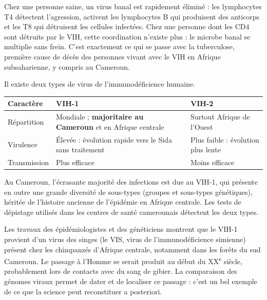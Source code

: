 \documentclass[11pt]{article}
\newcommand{\cle}[1]{{\popxbold\color{popdark}#1}}
\newcounter{popsec}
\newcounter{popsub}
\newcommand{\courssub}[1]{%
  \stepcounter{popsub}%
  \par\vspace{9pt}\noindent{\popxbold\fontsize{11.5}{13}\selectfont\color{popink}{\color{poporange}\thepopsec.\thepopsub}\hspace{6pt}#1}\par\nopagebreak\vspace{4pt}
}
\begin{document}
\begin{exemplebox}
Chez une personne saine, un virus banal est rapidement éliminé : les lymphocytes T4 détectent l'agression, activent les lymphocytes B qui produisent des anticorps et les T8 qui détruisent les cellules infectées. Chez une personne dont les CD4 sont détruits par le VIH, cette coordination n'existe plus : le microbe banal se multiplie sans frein. C'est exactement ce qui se passe avec la tuberculose, première cause de décès des personnes vivant avec le VIH en Afrique subsaharienne, y compris au Cameroun.
\end{exemplebox}

\courssub{Les types de VIH : VIH-1 et VIH-2}

Il existe deux types de virus de l'immunodéficience humaine.

\begin{center}
\begin{tabularx}{\linewidth}{|l|X|X|}\hline
\rowcolor{popblueL} \textbf{Caractère} & \textbf{VIH-1} & \textbf{VIH-2} \\ \hline
Répartition & Mondiale ; \textbf{majoritaire au Cameroun} et en Afrique centrale & Surtout Afrique de l'Ouest \\ \hline
Virulence & Élevée : évolution rapide vers le Sida sans traitement & Plus faible : évolution plus lente \\ \hline
Transmission & Plus efficace & Moins efficace \\ \hline
\end{tabularx}
\end{center}

Au Cameroun, l'écrasante majorité des infections est due au \cle{VIH-1}, qui présente en outre une grande diversité de sous-types (groupes et sous-types génétiques), héritée de l'histoire ancienne de l'épidémie en Afrique centrale. Les tests de dépistage utilisés dans les centres de santé camerounais détectent les deux types.

\begin{savaistu}
Les travaux des épidémiologistes et des généticiens montrent que le VIH-1 provient d'un virus des singes (le VIS, virus de l'immunodéficience simienne) présent chez les chimpanzés d'Afrique centrale, notamment dans les forêts du sud Cameroun. Le passage à l'Homme se serait produit au début du XX\textsuperscript{e} siècle, probablement lors de contacts avec du sang de gibier. La comparaison des génomes viraux permet de dater et de localiser ce passage : c'est un bel exemple de ce que la science peut reconstituer a posteriori.
\end{savaistu}
\end{document}

